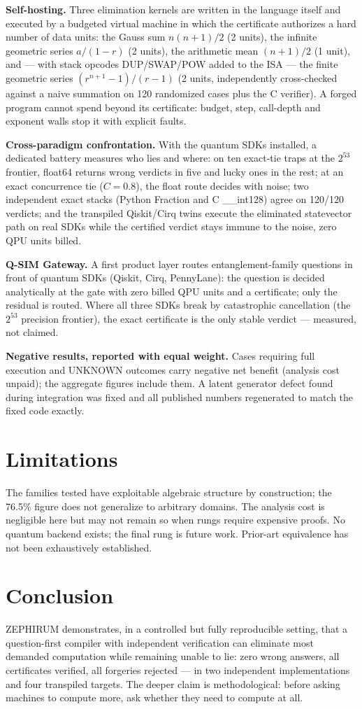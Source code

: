 \documentclass[11pt,a4paper]{article}
\begin{document}
\textbf{Self-hosting.} Three elimination kernels are written in the language
itself and executed by a budgeted virtual machine in which the certificate
authorizes a hard number of data units: the Gauss sum $n(n+1)/2$ (2 units),
the infinite geometric series $a/(1-r)$ (2 units), the arithmetic mean
$(n+1)/2$ (1 unit), and --- with stack opcodes DUP/SWAP/POW added to the ISA
--- the finite geometric series $(r^{n+1}-1)/(r-1)$ (2 units, independently
cross-checked against a naive summation on 120 randomized cases plus the C
verifier). A forged program cannot spend beyond its certificate: budget,
step, call-depth and exponent walls stop it with explicit faults.

\textbf{Cross-paradigm confrontation.} With the quantum SDKs installed,
a dedicated battery measures who lies and where: on ten exact-tie
traps at the $2^{53}$ frontier, float64 returns wrong verdicts in five
and lucky ones in the rest; at an exact concurrence tie ($C = 0.8$),
the float route decides with noise; two independent exact stacks
(Python Fraction and C \_\_int128) agree on 120/120 verdicts; and the
transpiled Qiskit/Cirq twins execute the eliminated statevector path
on real SDKs while the certified verdict stays immune to the noise,
zero QPU units billed.

\textbf{Q-SIM Gateway.} A first product layer routes entanglement-family
questions in front of quantum SDKs (Qiskit, Cirq, PennyLane): the question is
decided analytically at the gate with zero billed QPU units and a certificate;
only the residual is routed. Where all three SDKs break by
catastrophic cancellation (the $2^{53}$ precision frontier), the exact
certificate is the only stable verdict --- measured, not claimed.

\textbf{Negative results, reported with equal weight.} Cases requiring full
execution and UNKNOWN outcomes carry negative net benefit (analysis cost
unpaid); the aggregate figures include them. A latent generator defect found
during integration was fixed and all published numbers regenerated to match
the fixed code exactly.

\section{Limitations}
The families tested have exploitable algebraic structure by construction; the
76.5\% figure does not generalize to arbitrary domains. The analysis cost is
negligible here but may not remain so when rungs require expensive proofs. No
quantum backend exists; the final rung is future work. Prior-art equivalence
has not been exhaustively established.

\section{Conclusion}
ZEPHIRUM demonstrates, in a controlled but fully reproducible setting, that a
question-first compiler with independent verification can eliminate most
demanded computation while remaining unable to lie: zero wrong answers, all
certificates verified, all forgeries rejected --- in two independent
implementations and four transpiled targets. The deeper claim is
methodological: before asking machines to compute more, ask whether they need
to compute at all.
\end{document}
